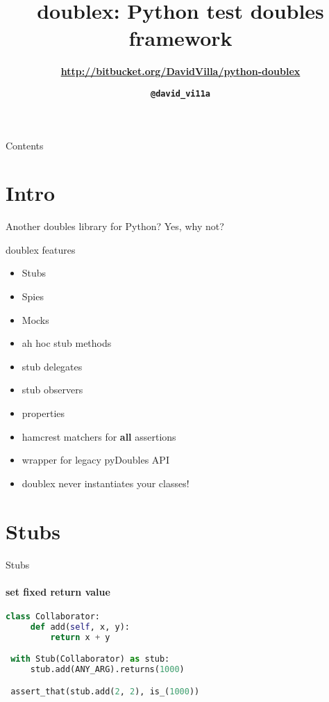 \documentclass[11pt]{beamer}
\title{doublex: Python test doubles framework}
\subtitle{\bfseries\small\url{http://bitbucket.org/DavidVilla/python-doublex}}
\author{\bfseries\small\texttt{@david\_vi11a}}
\date{}
\begin{document}
\begin{frame}
  \titlepage
\end{frame}

\begin{frame}{Contents}
  \tableofcontents
\end{frame}

\section{Intro}

\begin{frame}{Another doubles library for Python?}
  Yes, why not?
\end{frame}

\begin{frame}{doublex features}
  \begin{itemize}
  \item Stubs
  \item Spies
  \item Mocks
  \item ah hoc stub methods
  \item stub delegates
  \item stub observers
  \item properties
  \item hamcrest matchers for \textbf{all} assertions
  \item wrapper for legacy pyDoubles API
  \item doublex never instantiates your classes!
  \end{itemize}
\end{frame}

\section{Stubs}

\begin{frame}[fragile]{Stubs}
\framesubtitle{set fixed return value}

\begin{exampleblock}{}
\begin{lstlisting}[language=Python]
 class Collaborator:
     def add(self, x, y):
         return x + y

 with Stub(Collaborator) as stub:
     stub.add(ANY_ARG).returns(1000)

 assert_that(stub.add(2, 2), is_(1000))
\end{lstlisting}
\end{exampleblock}

\end{frame}
\end{document}

